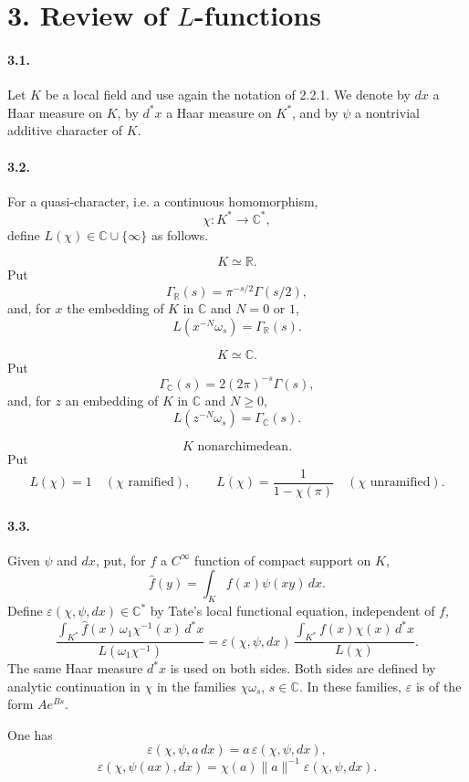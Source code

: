 \documentclass[10pt,letterpaper]{article}
\newcommand{\C}{\mathbb C}
\providecommand{\R}{\mathbb R}
\begin{document}
\section*{3. Review of \(L\)-functions}

\paragraph{3.1.} Let \(K\) be a local field and use again the notation of 2.2.1. We denote by \(dx\) a Haar measure on \(K\), by \(d^*x\) a Haar measure on \(K^*\), and by \(\psi\) a nontrivial additive character of \(K\).

\paragraph{3.2.} For a quasi-character, i.e. a continuous homomorphism,
\[
\chi:K^*\longrightarrow\C^*,
\]
define \(L(\chi)\in\C\cup\{\infty\}\) as follows.

\[
\tag{3.2.1}
K\simeq\R.
\]
Put
\[
\Gamma_\R(s)=\pi^{-s/2}\Gamma(s/2),
\]
and, for \(x\) the embedding of \(K\) in \(\C\) and \(N=0\) or \(1\),
\[
L(x^{-N}\omega_s)=\Gamma_\R(s).
\]

\[
\tag{3.2.2}
K\simeq\C.
\]
Put
\[
\Gamma_\C(s)=2(2\pi)^{-s}\Gamma(s),
\]
and, for \(z\) an embedding of \(K\) in \(\C\) and \(N\ge0\),
\[
L(z^{-N}\omega_s)=\Gamma_\C(s).
\]

\[
\tag{3.2.3}
K\text{ nonarchimedean.}
\]
Put
\[
L(\chi)=1\quad(\chi\text{ ramified}),
\qquad
L(\chi)=\frac1{1-\chi(\pi)}\quad(\chi\text{ unramified}).
\]

\paragraph{3.3.} Given \(\psi\) and \(dx\), put, for \(f\) a \(C^\infty\) function of compact support on \(K\),
\[
\widehat f(y)=\int_K f(x)\psi(xy)\,dx.
\]
Define \(\varepsilon(\chi,\psi,dx)\in\C^*\) by Tate's local functional equation, independent of \(f\),
\[
\tag{3.3.1}
\frac{\displaystyle\int_{K^*}\widehat f(x)\,\omega_1\chi^{-1}(x)\,d^*x}
     {L(\omega_1\chi^{-1})}
=
\varepsilon(\chi,\psi,dx)\,
\frac{\displaystyle\int_{K^*}f(x)\chi(x)\,d^*x}
     {L(\chi)}.
\]
The same Haar measure \(d^*x\) is used on both sides. Both sides are defined by analytic continuation in \(\chi\) in the families \(\chi\omega_s\), \(s\in\C\). In these families, \(\varepsilon\) is of the form \(Ae^{Bs}\).

One has
\[
\tag{3.3.2}
\varepsilon(\chi,\psi,a\,dx)=a\,\varepsilon(\chi,\psi,dx),
\]
\[
\tag{3.3.3}
\varepsilon(\chi,\psi(ax),dx)=\chi(a)\|a\|^{-1}\varepsilon(\chi,\psi,dx).
\]
\end{document}
